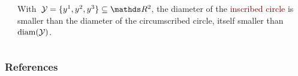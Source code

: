 \documentclass{polyu-presentation}
\newcommand{\xpt}[1][]{\mathcal{Y}\ifthenelse{\equal{#1}{}}{}{^{#1}}}
\begin{document}
\begin{frame}
\begin{columns}
\begin{column}{0.4\textwidth}
\begin{center}
            \end{center}
        \end{column}
        \begin{column}{0.6\textwidth}
            With~$\xpt = \set{y^1, y^2, y^3} \subseteq \R^2$, the diameter of the \textcolor{Maroon}{inscribed circle} is smaller than the diameter of the \textcolor{OliveGreen}{circumscribed circle}, itself smaller than~$\diam(\xpt)$.
        \end{column}
    \end{columns}
\end{frame}

\begin{frame}[t,allowframebreaks]
    \frametitle{References}

	\printbibliography
\end{frame}
\end{document}

